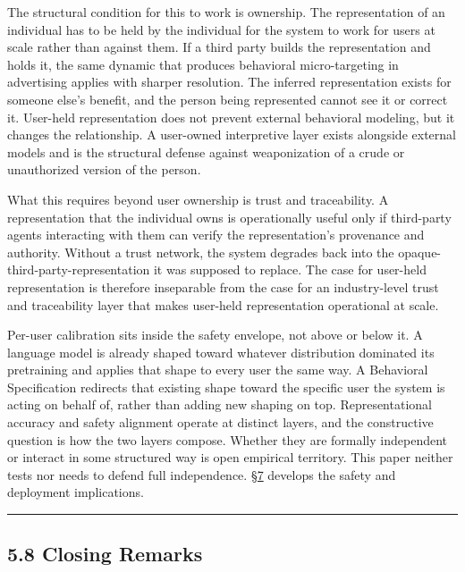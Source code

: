 The structural condition for this to work is ownership. The
representation of an individual has to be held by the individual for the
system to work for users at scale rather than against them. If a third
party builds the representation
and holds it, the same dynamic that produces behavioral micro-targeting
in advertising applies with sharper resolution. The inferred
representation exists for someone else's benefit, and the person being
represented cannot see it or correct it. User-held representation does
not prevent external behavioral modeling, but it changes the
relationship. A user-owned interpretive layer exists alongside external
models and is the structural defense against weaponization of a crude or
unauthorized version of the person.

What this requires beyond user ownership is trust and traceability. A
representation that the individual owns is operationally useful only if
third-party agents interacting with them can verify the representation's
provenance and authority. Without a trust network, the system degrades
back into the opaque-third-party-representation it was supposed to
replace. The case for user-held representation is therefore inseparable
from the case for an industry-level trust and traceability layer that
makes user-held representation operational at scale.

Per-user calibration sits inside the safety envelope, not above or below
it. A language model is already shaped toward whatever distribution
dominated its pretraining and applies that shape to every user the same
way. A Behavioral Specification redirects that existing shape toward the
specific user the system is acting on behalf of, rather than adding new
shaping on top. Representational accuracy and safety alignment operate
at distinct layers, and the constructive question is how the two layers
compose. Whether they are formally independent or interact in some
structured way is open empirical territory. This paper neither tests nor
needs to defend full independence. \hyperref[future-work]{§7} develops the safety and deployment
implications.

\begin{center}\rule{0.5\linewidth}{0.5pt}\end{center}

\hypertarget{closing-remarks}{%
\subsection{5.8 Closing Remarks}\label{closing-remarks}}

